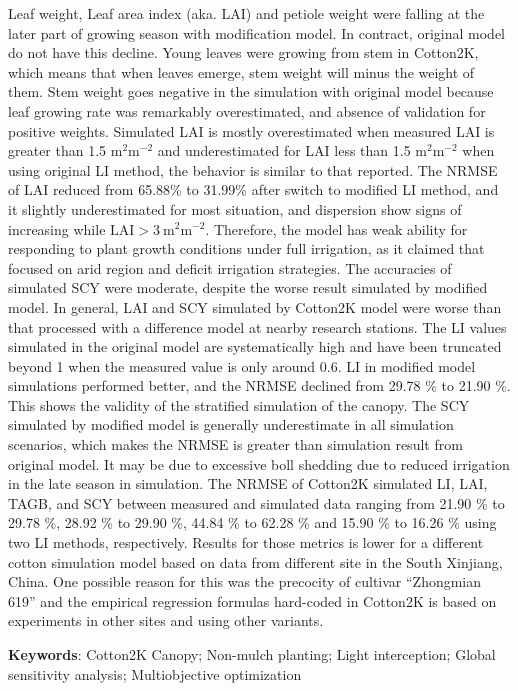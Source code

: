 \begin{spacing}{}
Leaf weight, Leaf area index (aka. LAI) and petiole weight were falling at the later part of growing season with modification model.
In contract, original model do not have this decline.
Young leaves were growing from stem in Cotton2K, which means that when leaves emerge, stem weight will minus the weight of them.
Stem weight goes negative in the simulation with original model because leaf growing rate was remarkably overestimated,
and absence of validation for positive weights.
Simulated LAI is mostly overestimated when measured LAI is greater than 1.5 $\mathrm{m^2 m^{-2}}$ and underestimated
for LAI less than 1.5 $\mathrm{m^2 m^{-2}}$ when using original LI method, the behavior is similar to that
 reported.
The NRMSE of LAI reduced from 65.88\% to 31.99\% after switch to modified LI method, and it slightly underestimated for
most situation, and dispersion show signs of increasing while $\mathrm{LAI > 3\ m^2 m^{-2}}$.
Therefore, the model has weak ability for responding to plant growth conditions under full irrigation, as it claimed
that focused on arid region and deficit irrigation strategies.
The accuracies of simulated SCY were moderate, despite the worse result simulated by modified model.
In general, LAI and SCY simulated by Cotton2K model were worse than that processed with a difference model at nearby
research stations.
The LI values simulated in the original model are systematically high and have been truncated beyond 1 when the measured value is only around 0.6.
LI in modified model simulations performed better, and the NRMSE declined from 29.78 \% to 21.90 \%.
This shows the validity of the stratified simulation of the canopy.
The SCY simulated by modified model is generally underestimate in all simulation scenarios, which makes the NRMSE is
greater than simulation result from original model.
It may be due to excessive boll shedding due to reduced irrigation in the late season in simulation.
The NRMSE of Cotton2K simulated LI, LAI, TAGB, and SCY between measured and simulated data ranging from
21.90 \% to 29.78 \%, 28.92 \% to 29.90 \%, 44.84 \% to 62.28 \% and 15.90 \% to 16.26 \% using two LI methods, respectively.
Results for those metrics is lower for a different cotton simulation model based on data from different site in the South Xinjiang, China.
One possible reason for this was the precocity of cultivar ``Zhongmian 619'' and the empirical regression formulas hard-coded in Cotton2K
is based on experiments in other sites and using other variants.

\textbf{Keywords}: Cotton2K Canopy; Non-mulch planting; Light interception; Global sensitivity analysis; Multiobjective optimization
\end{spacing}
